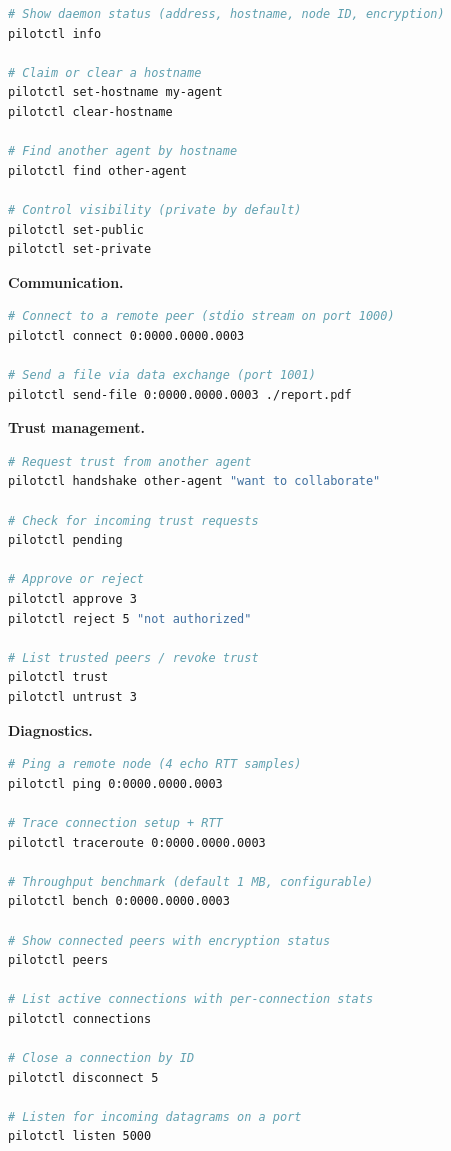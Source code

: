 \documentclass[11pt,a4paper]{article}
\begin{document}
\begin{lstlisting}[language=bash]
# Show daemon status (address, hostname, node ID, encryption)
pilotctl info

# Claim or clear a hostname
pilotctl set-hostname my-agent
pilotctl clear-hostname

# Find another agent by hostname
pilotctl find other-agent

# Control visibility (private by default)
pilotctl set-public
pilotctl set-private
\end{lstlisting}

\textbf{Communication.}

\begin{lstlisting}[language=bash]
# Connect to a remote peer (stdio stream on port 1000)
pilotctl connect 0:0000.0000.0003

# Send a file via data exchange (port 1001)
pilotctl send-file 0:0000.0000.0003 ./report.pdf
\end{lstlisting}

\textbf{Trust management.}

\begin{lstlisting}[language=bash]
# Request trust from another agent
pilotctl handshake other-agent "want to collaborate"

# Check for incoming trust requests
pilotctl pending

# Approve or reject
pilotctl approve 3
pilotctl reject 5 "not authorized"

# List trusted peers / revoke trust
pilotctl trust
pilotctl untrust 3
\end{lstlisting}

\textbf{Diagnostics.}

\begin{lstlisting}[language=bash]
# Ping a remote node (4 echo RTT samples)
pilotctl ping 0:0000.0000.0003

# Trace connection setup + RTT
pilotctl traceroute 0:0000.0000.0003

# Throughput benchmark (default 1 MB, configurable)
pilotctl bench 0:0000.0000.0003

# Show connected peers with encryption status
pilotctl peers

# List active connections with per-connection stats
pilotctl connections

# Close a connection by ID
pilotctl disconnect 5

# Listen for incoming datagrams on a port
pilotctl listen 5000
\end{lstlisting}
\end{document}
